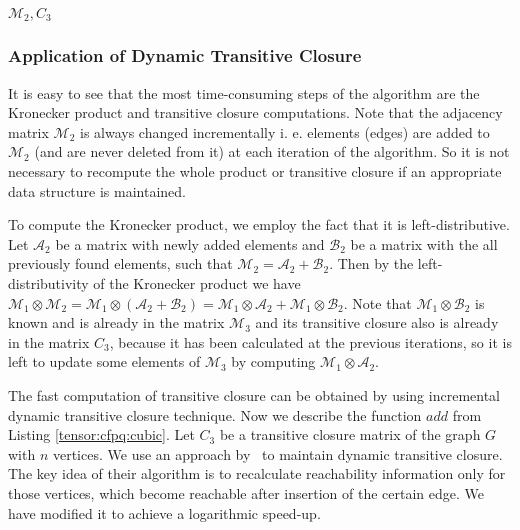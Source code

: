 \begin{algorithm}[h]
\begin{algorithmic}[1]
\State \Return $\mathcal{M}_2, C_3$
\EndFunction
{}
    \State {}
\EndFunction
{}
    \State {}
\EndFunction
\end{algorithmic}
\end{algorithm}
\subsubsection{Application of Dynamic Transitive Closure}
It is easy to see that the most time-consuming steps of the algorithm are the Kronecker product and transitive closure computations.
Note that the adjacency matrix $\mathcal{M}_2$ is always changed incrementally i. e. elements (edges) are added to $\mathcal{M}_2$ (and are never deleted from it) at each iteration of the algorithm.
So it is not necessary to recompute the whole product or transitive closure if an appropriate data structure is maintained.

To compute the Kronecker product, we employ the fact that it is left-distributive.
Let $\mathcal{A}_2$ be a matrix with newly added elements and $\mathcal{B}_2$ be a matrix with the all previously found elements, such that $\mathcal{M}_2 = \mathcal{A}_2 + \mathcal{B}_2$.
Then by the left-distributivity of the Kronecker product we have $\mathcal{M}_1 \otimes \mathcal{M}_2 = \mathcal{M}_1 \otimes (\mathcal{A}_2 + \mathcal{B}_2) = \mathcal{M}_1\otimes \mathcal{A}_2 + \mathcal{M}_1 \otimes \mathcal{B}_2$.
Note that $\mathcal{M}_1 \otimes \mathcal{B}_2$ is known and is already in the matrix $\mathcal{M}_3$ and its transitive closure also is already in the matrix $C_3$, because it has been calculated at the previous iterations, so it is left to update some elements of $\mathcal{M}_3$ by computing $\mathcal{M}_1\otimes \mathcal{A}_2$.


The fast computation of transitive closure can be obtained by using incremental dynamic transitive closure technique. Now we describe the function $add$ from Listing \ref{tensor:cfpq:cubic}. Let $C_3$ be a transitive closure matrix of the graph $G$ with $n$ vertices. We use an approach by~\cite{IBARAKI198395} to maintain dynamic transitive closure. The key idea of their algorithm is to recalculate reachability information only for those vertices, which become reachable after insertion of the certain edge. We have modified it to achieve a logarithmic speed-up.


